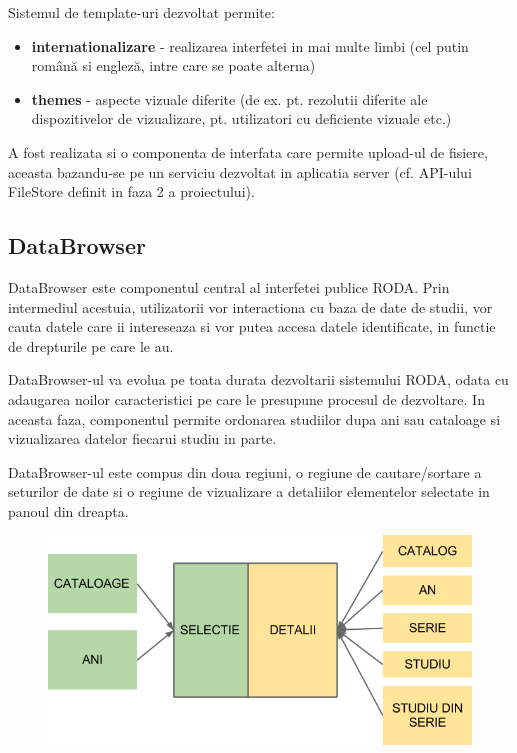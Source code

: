 \documentclass[a4paper, 10pt]{article}
\begin{document}
\medskip

Sistemul de template-uri dezvoltat permite:
\begin{itemize}
\item {\textbf{internationalizare}} - realizarea interfetei in mai multe limbi (cel putin rom\^{a}n\u{a} si englez\u{a}, intre care se poate alterna)
\item {\textbf{themes}} - aspecte vizuale diferite (de ex. pt. rezolutii diferite ale dispozitivelor de vizualizare, pt. utilizatori cu deficiente vizuale etc.)
\end{itemize}

A fost realizata si o componenta de interfata care permite upload-ul de fisiere, aceasta bazandu-se pe un serviciu dezvoltat in aplicatia server (cf. API-ului FileStore definit in faza 2 a proiectului).

\medskip

\subsection*{DataBrowser}

\medskip

DataBrowser este componentul central al interfetei publice RODA. Prin intermediul acestuia, utilizatorii vor
interactiona cu baza de date de studii, vor cauta datele care ii intereseaza si vor putea accesa datele identificate,
in functie de drepturile pe care le au.

\medskip

DataBrowser-ul va evolua pe toata durata dezvoltarii sistemului RODA, odata cu adaugarea noilor caracteristici pe care
le presupune procesul de dezvoltare. In aceasta faza, componentul permite ordonarea studiilor dupa ani sau cataloage si
vizualizarea datelor fiecarui studiu in parte.

\medskip

DataBrowser-ul este compus din doua regiuni, o regiune de cautare/sortare a seturilor de date si o regiune de
vizualizare a detaliilor elementelor selectate in panoul din dreapta.

\medskip

\begin{figure}[h!tb]
\centering
\includegraphics[width=\textwidth]{roda_databrowser-img001.png} 
\end{figure}
\end{document}
